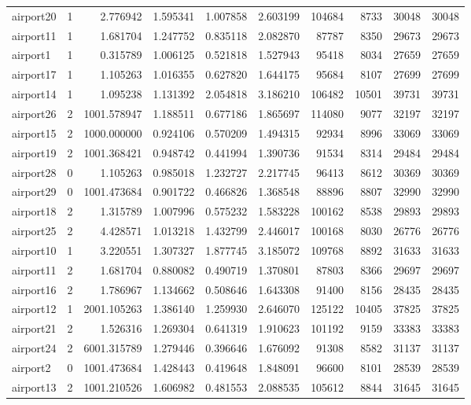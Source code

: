 \begin{longtable}{|l|r|r|r|r|r|r|r|r|r|}
airport20 & 1 & 2.776942 & 1.595341 & 1.007858 & 2.603199 & 104684 & 8733 & 30048 & 30048 \\
airport11 & 1 & 1.681704 & 1.247752 & 0.835118 & 2.082870 & 87787 & 8350 & 29673 & 29673 \\
airport1 & 1 & 0.315789 & 1.006125 & 0.521818 & 1.527943 & 95418 & 8034 & 27659 & 27659 \\
airport17 & 1 & 1.105263 & 1.016355 & 0.627820 & 1.644175 & 95684 & 8107 & 27699 & 27699 \\
airport14 & 1 & 1.095238 & 1.131392 & 2.054818 & 3.186210 & 106482 & 10501 & 39731 & 39731 \\
airport26 & 2 & 1001.578947 & 1.188511 & 0.677186 & 1.865697 & 114080 & 9077 & 32197 & 32197 \\
airport15 & 2 & 1000.000000 & 0.924106 & 0.570209 & 1.494315 & 92934 & 8996 & 33069 & 33069 \\
airport19 & 2 & 1001.368421 & 0.948742 & 0.441994 & 1.390736 & 91534 & 8314 & 29484 & 29484 \\
airport28 & 0 & 1.105263 & 0.985018 & 1.232727 & 2.217745 & 96413 & 8612 & 30369 & 30369 \\
airport29 & 0 & 1001.473684 & 0.901722 & 0.466826 & 1.368548 & 88896 & 8807 & 32990 & 32990 \\
airport18 & 2 & 1.315789 & 1.007996 & 0.575232 & 1.583228 & 100162 & 8538 & 29893 & 29893 \\
airport25 & 2 & 4.428571 & 1.013218 & 1.432799 & 2.446017 & 100168 & 8030 & 26776 & 26776 \\
airport10 & 1 & 3.220551 & 1.307327 & 1.877745 & 3.185072 & 109768 & 8892 & 31633 & 31633 \\
airport11 & 2 & 1.681704 & 0.880082 & 0.490719 & 1.370801 & 87803 & 8366 & 29697 & 29697 \\
airport16 & 2 & 1.786967 & 1.134662 & 0.508646 & 1.643308 & 91400 & 8156 & 28435 & 28435 \\
airport12 & 1 & 2001.105263 & 1.386140 & 1.259930 & 2.646070 & 125122 & 10405 & 37825 & 37825 \\
airport21 & 2 & 1.526316 & 1.269304 & 0.641319 & 1.910623 & 101192 & 9159 & 33383 & 33383 \\
airport24 & 2 & 6001.315789 & 1.279446 & 0.396646 & 1.676092 & 91308 & 8582 & 31137 & 31137 \\
airport2 & 0 & 1001.473684 & 1.428443 & 0.419648 & 1.848091 & 96600 & 8101 & 28539 & 28539 \\
airport13 & 2 & 1001.210526 & 1.606982 & 0.481553 & 2.088535 & 105612 & 8844 & 31645 & 31645 \\

\end{longtable}
